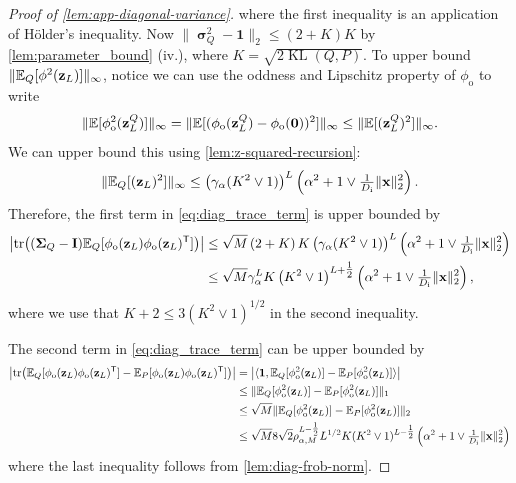 \documentclass[twoside]{article}
\renewcommand{\ss}[1]{_{\text{#1}}}
\newcommand{\vx}{\mathbf{x}}
\newcommand{\vz}{\mathbf{z}}
\newcommand{\vsigma}{\bm{\upsigma}}
\newcommand{\vone}{\mathbf{1}}
\newcommand{\mI}{\mathbf{I}}
\newcommand{\mSigma}{\mathbf{\Sigma}}
\newcommand{\E}{\mathbb{E}}
\renewcommand{\P}{\mathbb{P}}
\newcommand{\Q}{\mathbb{Q}}
\renewcommand{\Q}{\ensuremath{Q}}
\renewcommand{\P}{\ensuremath{P}}
\newcommand{\T}{\text{\textsf{T}}}
\newcommand{\KL}{\operatorname{KL}}
\renewcommand{\ss}[1]{_{\text{#1}}}        %
\DeclarePairedDelimiter\parens{(}{)}             %
\DeclarePairedDelimiter\norm{\|}{\|}             %
\theoremstyle{theoremstyle}
\begin{document}
\begin{proof}[Proof of \cref{lem:app-diagonal-variance}]
where the first inequality is an application of H\"{o}lder's inequality. Now $\|\vsigma_Q^2 -\vone\|_{2} \leq \left (2 + K\right)K$ by \cref{lem:parameter_bound} (iv.), where $K = \sqrt{2\KL(\Q,\P)}$. To upper bound $\norm{\E_Q[\phi^2(\vz_L)]}_\infty$, notice we can use the oddness and Lipschitz property of $\phi\ss{o}$ to write
    \begin{equation}
        \norm{\E[\phi\ss{o}^2(\vz^Q_L)]}_\infty = \norm{\E[(\phi\ss{o}(\vz^Q_L) - \phi\ss{o}(\mathbf{0}))^2]}_\infty
        \le \norm{\E[(\vz^Q_L)^2]}_\infty.
    \end{equation}
    We can upper bound this using \cref{lem:z-squared-recursion}:
    \begin{align}
        \norm{\E_{\Q}[(\vz_L)^2]}_\infty \leq \left(\gamma_\alpha(K^2 \lor 1)\right)^{L}\left(\alpha^2 + 1\lor \tfrac1{D\ss{i}}\|\vx\|^2_2\right).
    \end{align} 
Therefore, the first term in \cref{eq:diag_trace_term} is upper bounded by
\begin{align}
    \left\lvert\mathrm{tr}\parens*{
        \parens*{\mSigma_Q- \mI}\E_{\Q}[\phi\ss{o}(\vz_{L})\phi\ss{o}(\vz_{L})^\T]} \right\rvert
    &\le \sqrt{M}
        \left(2 + K\right)K
        \left(\gamma_\alpha(K^2 \lor 1)\right)^{L}\left(\alpha^2 + 1\lor \tfrac1{D\ss{i}}\|\vx\|^2_2\right) \\
    &\le \sqrt{M}
        \gamma_\alpha^{L} K \left(K^2 \lor 1\right)^{L+\tfrac12}\left(\alpha^2 + 1\lor \tfrac1{D\ss{i}}\|\vx\|^2_2\right),
\end{align}
where we use that $K + 2 \le 3 (K^2 \lor 1)^{1/2}$ in the second inequality. 

The second term in \cref{eq:diag_trace_term} can be upper bounded by
\begin{align}
    \left\lvert \mathrm{tr}\parens*{\E_{\Q}[\phi\ss{o}(\vz_{L})\phi\ss{o}(\vz_{L})^\T]-\E_{\P}[\phi\ss{o}(\vz_{L})\phi\ss{o}(\vz_{L})^\T]} \right\rvert 
    &= \left\lvert \langle \vone, \E_{\Q}[\phi\ss{o}^2(\vz_{L}) ] - \E_{\P}[\phi\ss{o}^2(\vz_{L}) ] \rangle \right\rvert
    \\
    &\le \norm{\E_{\Q}[\phi\ss{o}^2(\vz_{L}) ] - \E_{\P}[\phi\ss{o}^2(\vz_{L}) ]}_1
    \\
    &\le \sqrt{M} \norm{\E_{\Q}[\phi\ss{o}^2(\vz_{L}) ] - \E_{\P}[\phi\ss{o}^2(\vz_{L}) ]}_2
    \\
    &\le \sqrt{M} 8 \sqrt{2} \rho_{\alpha, M}^{L-\tfrac12} L^{1/2} K (K^2 \lor 1)^{L-\tfrac12}\left(\alpha^2 + 1\lor \tfrac1{D\ss{i}}\|\vx\|^2_2\right)
\end{align}
where the last inequality follows from \cref{lem:diag-frob-norm}. 


\end{proof}
\end{document}
